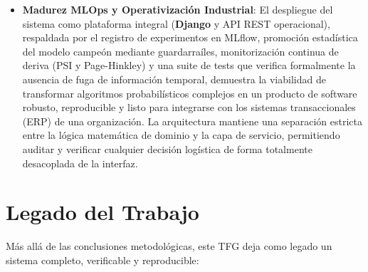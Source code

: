 \begin{itemize}
    \item \textbf{Madurez MLOps y Operativización Industrial}: El despliegue del sistema como plataforma integral (\textbf{Django} y API REST operacional), respaldada por el registro de experimentos en MLflow, promoción estadística del modelo campeón mediante guardarraíles, monitorización continua de deriva (PSI y Page-Hinkley) y una suite de tests que verifica formalmente la ausencia de fuga de información temporal, demuestra la viabilidad de transformar algoritmos probabilísticos complejos en un producto de software robusto, reproducible y listo para integrarse con los sistemas transaccionales (ERP) de una organización. La arquitectura mantiene una separación estricta entre la lógica matemática de dominio y la capa de servicio, permitiendo auditar y verificar cualquier decisión logística de forma totalmente desacoplada de la interfaz.
\end{itemize}

\section{Legado del Trabajo}
\label{sec:legado}

Más allá de las conclusiones metodológicas, este TFG deja como legado un sistema completo, verificable y reproducible:

